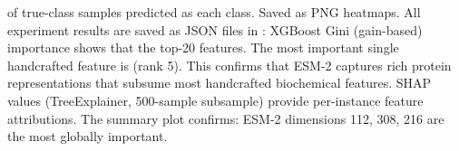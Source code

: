 {}of true-class samples predicted as each class. Saved as PNG heatmaps.\markdownRendererInterblockSeparator
{}
\markdownRendererSectionEnd \markdownRendererSectionBegin
{}\markdownRendererInterblockSeparator
{}All experiment results are saved as JSON files in :\markdownRendererInterblockSeparator
{}\markdownRendererUlBeginTight
\markdownRendererUlItem {}\markdownRendererUlItemEnd 
\markdownRendererUlItem {}\markdownRendererUlItemEnd 
\markdownRendererUlItem {}\markdownRendererUlItemEnd 
\markdownRendererUlItem {}\markdownRendererUlItemEnd 
\markdownRendererUlItem {}\markdownRendererUlItemEnd 
\markdownRendererUlItem {}\markdownRendererUlItemEnd 
\markdownRendererUlEndTight \markdownRendererInterblockSeparator
{}\markdownRendererThematicBreak{}\markdownRendererInterblockSeparator
{}
\markdownRendererSectionEnd 
\markdownRendererSectionEnd \markdownRendererSectionBegin
{}\markdownRendererInterblockSeparator
{}\markdownRendererSectionBegin
{}\markdownRendererInterblockSeparator
{}XGBoost Gini (gain-based) importance shows that \markdownRendererSoftLineBreak
{}the top-20 features. The most important single handcrafted feature is \markdownRendererSoftLineBreak
{}(rank 5). This confirms that ESM-2 captures rich protein representations that subsume most\markdownRendererSoftLineBreak
{}handcrafted biochemical features.\markdownRendererInterblockSeparator
{}
\markdownRendererSectionEnd \markdownRendererSectionBegin
{}\markdownRendererInterblockSeparator
{}SHAP values (TreeExplainer, 500-sample subsample) provide per-instance feature attributions.\markdownRendererSoftLineBreak
{}The summary plot confirms:\markdownRendererInterblockSeparator
{}\markdownRendererUlBeginTight
\markdownRendererUlItem ESM-2 dimensions 112, 308, 216 are the most globally important.\markdownRendererUlItemEnd 
